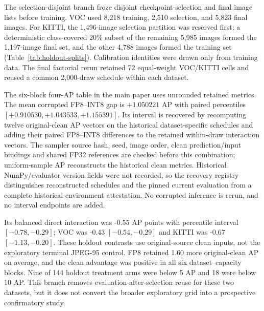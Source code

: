 \documentclass[10pt]{article}
\begin{document}
The selection-disjoint branch froze disjoint checkpoint-selection and final image lists
before training. VOC used 8,218 training, 2,510 selection, and 5,823 final
images. For KITTI, the 1,496-image selection partition was reserved first; a
deterministic class-covered 20\% subset of the remaining 5,985 images formed
the 1,197-image final set, and the other 4,788 images formed the training set
(Table~\ref{tab:holdout-splits}). Calibration identities were drawn only
from training data. The final factorial rerun retained 72 equal-weight
VOC/KITTI cells and reused a common 2,000-draw schedule within each dataset.

The six-block four-AP table in the main paper uses unrounded retained metrics.
The mean corrupted FP8--INT8 gap is $+1.050221$ AP with paired percentiles
$[+0.910530,+1.043533,+1.155391]$. Its interval is recovered by recomputing
twelve original-clean AP vectors on the historical dataset-specific schedules
and adding their paired FP8--INT8 differences to the retained within-draw
interaction vectors. The sampler source hash, seed, image order, clean
prediction/input bindings and shared FP32 references are checked before this
combination; uniform-sample AP reconstructs the historical clean metrics.
Historical NumPy/evaluator version fields were not recorded, so the recovery
registry distinguishes reconstructed schedules and the pinned current
evaluation from a complete historical-environment attestation. No corrupted
inference is rerun, and no interval endpoints are added.

Its balanced direct interaction was -0.55 AP points with percentile interval
$[-0.78,-0.29]$; VOC was -0.43 $[-0.54,-0.29]$ and KITTI was -0.67
$[-1.13,-0.20]$. These holdout contrasts use original-source clean inputs, not
the exploratory terminal JPEG-95 control. FP8 retained 1.60 more original-clean AP on average, and the
clean advantage was positive in all six dataset--capacity blocks. Nine of 144
holdout treatment arms were below 5 AP and 18 were below 10 AP. This branch
removes evaluation-after-selection reuse for these two datasets, but it does
not convert the broader exploratory grid into a prospective confirmatory study.

\begin{table}[htbp]
\centering
\caption{Selection-disjoint partition counts. The KITTI final set is a
class-covered subset of the post-selection remainder, not 20\% of the complete
7,481-image labeled universe.}
\label{tab:holdout-splits}
\small
\resizebox{0.88\textwidth}{!}{}
\end{table}
\end{document}
